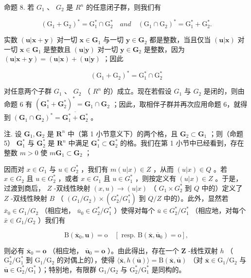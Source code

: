 命题 8. 若 \(G_{1}\) 、 \(G_{2}\) 是 \(R^{n}\) 的任意闭子群，则我们有

\[
(\mathrm{G} _ {1} + \mathrm{G} _ {2}) ^ {*} = \mathrm{G} _ {1} ^ {*} \cap \mathrm{G} _ {2} ^ {*} \quad a n d \quad (\mathrm{G} _ {1} \cap \mathrm{G} _ {2}) ^ {*} = \mathrm{G} _ {1} ^ {*} + \mathrm{G} _ {2} ^ {*}.
\]

实数 \((\pmb{u}|\pmb{x} + \pmb{y})\) 对一切 \(\pmb{x} \in \mathbf{G}_1\) 与一切 \(\pmb{y} \in \mathbf{G}_2\) 都是整数，当且仅当 \((\pmb{u}|\pmb{x})\) 对一切 \(\pmb{x} \in \mathbf{G}_1\) 是整数且 \((\pmb{u}|\pmb{y})\) 对一切 \(\pmb{y} \in \mathbf{G}_2\) 是整数，因为 \((\pmb{u}|\pmb{x} + \pmb{y}) = (\pmb{u}|\pmb{x}) + (\pmb{u}|\pmb{y})\) ；因此

\[
(\mathrm{G} _ {1} + \mathrm{G} _ {2}) ^ {*} = \mathrm{G} _ {1} ^ {*} \cap \mathrm{G} _ {2} ^ {*}
\]

对任意两个子群 \(G_{1}\) 、 \(G_{2}\) （ \(R^{n}\) 的）成立。现在若假设 \(G_{1}\) 与 \(G_{2}\) 是闭的，则由命题 6 有 \((\mathbf{G}_{1}^{*} + \mathbf{G}_{2}^{*})^{*} = \mathbf{G}_{1} \cap \mathbf{G}_{2}\) ；因此，取相伴子群并再次应用命题 6，就得到 \((\mathbf{G}_{1} \cap \mathbf{G}_{2})^{*} = \overline{\mathbf{G}_{1}^{*} + \mathbf{G}_{2}^{*}}\) 。

注. 设 \(\mathbf{G}_1, \mathbf{G}_2\) 是 \(\mathbf{R}^n\) 中（第 1 小节意义下）的两个格，且 \(\mathbf{G}_2 \subset \mathbf{G}_1\) ；则（命题 5） \(\mathbf{G}_1^*\) 与 \(\mathbf{G}_2^*\) 是 \(\mathbf{R}^n\) 中满足 \(\mathbf{G}_1^* \subset \mathbf{G}_2^*\) 的格。我们在第 1 小节中已经看到，存在整数 \(m > 0\) 使 \(m\mathbf{G}_1 \subset \mathbf{G}_2\) ；

因而对 \(x \in G_1\) 与 \(u \in G_2^*\) ，我们有 \(m(u|x) \in Z\) ，从而 \((u|x) \in Q\) 。若 \(x \in G_2\) 且 \(u \in G_2^*\) ，或者 \(x \in G_1\) 且 \(u \in G_1^*\) ，则按定义有 \((u|x) \in Z\) 。于是，过渡到商后， \(Z\) -双线性映射 \((x, u) \to (u|x)\) （ \(G_1 \times G_2^*\) 到 \(Q\) 中的）定义了 \(Z\) -双线性映射 \(B\) （ \((G_1/G_2) \times (G_2^*/G_1^*)\) 到 \(Q/Z\) 中的）。此外，显然若 \(\bar{x}_0 \in G_1/G_2\) （相应地， \(\bar{u}_0 \in G_2^*/G_1^*\) ）使得对每个 \(\bar{u} \in G_2^*/G_1^*\) （相应地，对每个 \(\bar{x} \in G_1/G_2\) ）我们有

\[
\mathrm{B} (\overline {{{\boldsymbol {x}}}} _ {0}, \boldsymbol {u}) = \mathrm{o} \quad [ \text { resp. } \mathrm{B} (\overline {{{\boldsymbol {x}}}}, \overline {{{\boldsymbol {u}}}} _ {0}) = \mathrm{o} ],
\]

则必有 \(\overline{\mathbf{x}}_0 = \mathbf{o}\) （相应地， \(\overline{\mathbf{u}}_0 = \mathbf{o}\) ）。由此得出，存在一个 \(\mathbf{Z}\) -线性双射 \(h\) （ \(\mathrm{G}_2^* / \mathrm{G}_1^*\) 到 \(\mathrm{G}_1 / \mathrm{G}_2\) 的对偶上的），使得 \(\langle \overline{\mathbf{x}}, h(\overline{\mathbf{u}}) \rangle = \mathrm{B}(\overline{\mathbf{x}}, \overline{\mathbf{u}})\) （对 \(\overline{\mathbf{x}} \in \mathrm{G}_1 / \mathrm{G}_2\) 与 \(\overline{\mathbf{u}} \in \mathrm{G}_2^* / \mathrm{G}_1^*\) ）；特别地，有限群 \(\mathrm{G}_1 / \mathrm{G}_2\) 与 \(\mathrm{G}_2^* / \mathrm{G}_1^*\) 是同构的。

